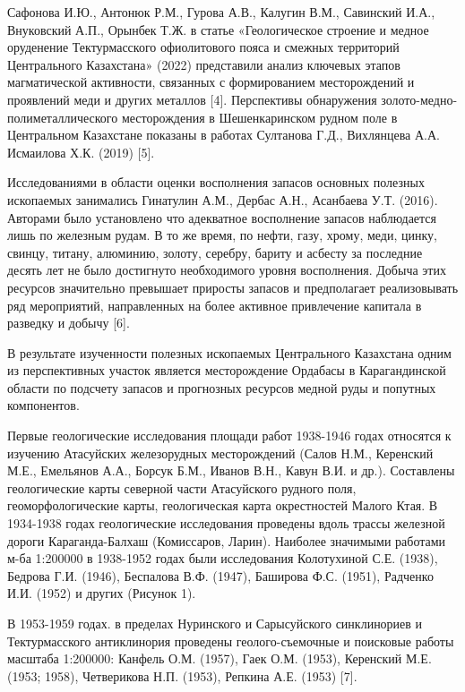 \begin{multicols}{2}
Сафонова И.Ю., Антонюк Р.М., Гурова А.В., Калугин В.М., Савинский И.А.,
Внуковский А.П., Орынбек Т.Ж. в статье «Геологическое строение и медное
оруденение Тектурмасского офиолитового пояса и смежных территорий
Центрального Казахстана» (2022) представили анализ ключевых этапов
магматической активности, связанных с формированием месторождений и
проявлений меди и других металлов {[}4{]}. Перспективы обнаружения
золото-медно-полиметаллического месторождения в Шешенкаринском рудном
поле в Центральном Казахстане показаны в работах Султанова Г.Д.,
Вихлянцева А.А. Исмаилова Х.К. (2019) {[}5{]}.

Исследованиями в области оценки восполнения запасов основных полезных
ископаемых занимались Гинатулин А.М., Дербас А.Н., Асанбаева У.Т.
(2016). Авторами было установлено что адекватное восполнение запасов
наблюдается лишь по железным рудам. В то же время, по нефти, газу,
хрому, меди, цинку, свинцу, титану, алюминию, золоту, серебру, бариту и
асбесту за последние десять лет не было достигнуто необходимого уровня
восполнения. Добыча этих ресурсов значительно превышает приросты запасов
и предполагает реализовывать ряд мероприятий, направленных на более
активное привлечение капитала в разведку и добычу {[}6{]}.

В результате изученности полезных ископаемых Центрального Казахстана
одним из перспективных участок является месторождение Ордабасы в
Карагандинской области по подсчету запасов и прогнозных ресурсов медной
руды и попутных компонентов.

Первые геологические исследования площади работ 1938-1946 годах
относятся к изучению Атасуйских железорудных месторождений (Салов Н.М.,
Керенский М.Е., Емельянов А.А., Борсук Б.М., Иванов В.Н., Кавун В.И. и
др.). Составлены геологические карты северной части Атасуйского рудного
поля, геоморфологические карты, геологическая карта окрестностей Малого
Ктая. В 1934-1938 годах геологические исследования проведены вдоль
трассы железной дороги Караганда-Балхаш (Комиссаров, Ларин). Наиболее
значимыми работами м-ба 1:200000 в 1938-1952 годах были исследования
Колотухиной С.Е. (1938), Бедрова Г.И. (1946), Беспалова В.Ф. (1947),
Баширова Ф.С. (1951), Радченко И.И. (1952) и других (Рисунок 1).

В 1953-1959 годах. в пределах Нуринского и Сарысуйского синклинориев и
Тектурмасского антиклинория проведены геолого-съемочные и поисковые
работы масштаба 1:200000: Канфель О.М. (1957), Гаек О.М. (1953),
Керенский М.Е. (1953; 1958), Четверикова Н.П. (1953), Репкина А.Е.
(1953) {[}7{]}.


\end{multicols}
